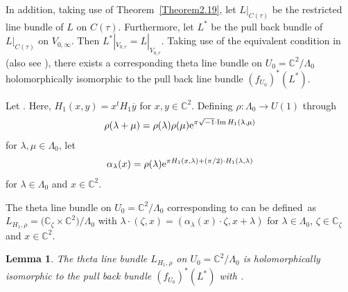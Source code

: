 \documentclass[pdftex]{sigma}
\numberwithin{equation}{section}
\newtheorem{Lemma}[Theorem]{Lemma}
\begin{document}
In addition, taking use of Theorem~\ref{Theorem2.19}, let $L|_{C(\tau)}$ be the restricted line bundle of $L$ on $C(\tau)$. Furthermore, let $L^*$ be the pull back bundle of $L|_{C(\tau)}$ on $V_{0,\infty}$. Then $L^*|_{V_{0,r}}=L|_{V_{0,r}}$. Taking use of the equivalent condition in \cite[Theorem]{Christian} (also see \cite{Takayuki-Takato2}), there exists a corresponding theta line bundle on $U_0=\mathbb{C}^2/{\Lambda_0}$ holomorphically isomorphic to the pull back line bundle $(f_{U_0})^*(L^*)$.

Let . Here, $H_1(x,y)=x^tH_1 \overline{y}$ for $x,y \in \mathbb{C}^2$. Defining
$\rho\colon \Lambda_0 \rightarrow U(1)$ through
\[
\rho(\lambda+\mu)=\rho(\lambda)\rho(\mu){\rm e}^{\pi\sqrt{-1}\cdot\operatorname{ Im}H_1(\lambda,\mu)}
\]
 for $ \lambda, \mu \in \Lambda_0 $, let \[\alpha_\lambda(x)=\rho (\lambda){\rm e}^{\pi H_1(x,\lambda)+(\pi/2)\cdot H_1(\lambda,\lambda)}\] for $ \lambda \in \Lambda_0 $ and $ x \in \mathbb{C}^2 $.

The theta line bundle on $U_0=\mathbb{C}^2/{\Lambda_0}$ corresponding to  can be defined~as ${
L_{H_1,\rho}=\bigl(\mathbb{C}_{\zeta} \times \mathbb{C}^2\bigr)/{\Lambda_0}}
$
with $\lambda \cdot (\zeta, x)=$$(\alpha_\lambda(x)\cdot \zeta, x+\lambda )$ for $\lambda \in\Lambda_0$, $\zeta \in \mathbb{C}_\zeta$ and $x \in \mathbb{C}^2$.

\begin{Lemma} \label{Lemma3.17}
The theta line bundle $L_{H_1,\rho}$ on $U_0=\mathbb{C}^2/{\Lambda_0}$ is holomorphically isomorphic to the pull back bundle $(f_{U_0})^*(L^*)$ with .
\end{Lemma}
\end{document}
